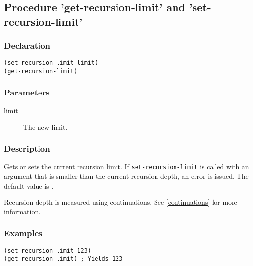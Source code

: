 \subsection{Procedure 'get-recursion-limit' and 'set-recursion-limit'}
\label{builtins/recursion-limit}

\subsubsection*{Declaration}
\begin{lstlisting}
(set-recursion-limit limit)
(get-recursion-limit)
\end{lstlisting}

\subsubsection*{Parameters}
\begin{description}
	\item[limit] The new limit.
\end{description}

\subsubsection*{Description}
Gets or sets the current recursion limit. If \lstinline|set-recursion-limit| is called with an argument that is smaller than the current recursion depth, an error is issued. The default value is \recursionLimit{}.

Recursion depth is measured using continuations. See \ref{continuations} for more information.

\subsubsection*{Examples}
\begin{lstlisting}
(set-recursion-limit 123)
(get-recursion-limit) ; Yields 123
\end{lstlisting}
